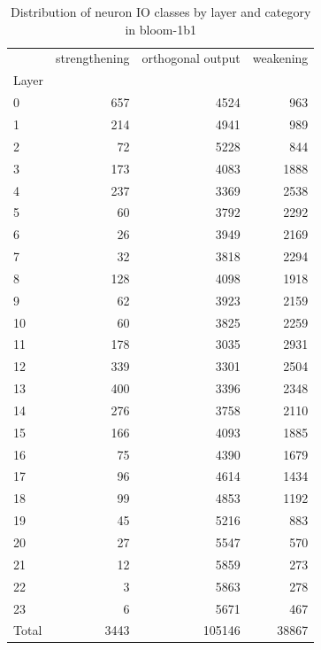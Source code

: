 \begin{table}
\caption{Distribution of neuron IO classes by layer and category in bloom-1b1}
\label{tab:bloom-1b1}
\begin{tabular}{lrrr}
 & strengthening & orthogonal output & weakening \\
Layer &  &  &  \\
0 & 657 & 4524 & 963 \\
1 & 214 & 4941 & 989 \\
2 & 72 & 5228 & 844 \\
3 & 173 & 4083 & 1888 \\
4 & 237 & 3369 & 2538 \\
5 & 60 & 3792 & 2292 \\
6 & 26 & 3949 & 2169 \\
7 & 32 & 3818 & 2294 \\
8 & 128 & 4098 & 1918 \\
9 & 62 & 3923 & 2159 \\
10 & 60 & 3825 & 2259 \\
11 & 178 & 3035 & 2931 \\
12 & 339 & 3301 & 2504 \\
13 & 400 & 3396 & 2348 \\
14 & 276 & 3758 & 2110 \\
15 & 166 & 4093 & 1885 \\
16 & 75 & 4390 & 1679 \\
17 & 96 & 4614 & 1434 \\
18 & 99 & 4853 & 1192 \\
19 & 45 & 5216 & 883 \\
20 & 27 & 5547 & 570 \\
21 & 12 & 5859 & 273 \\
22 & 3 & 5863 & 278 \\
23 & 6 & 5671 & 467 \\
Total & 3443 & 105146 & 38867 \\
\end{tabular}
\end{table}
